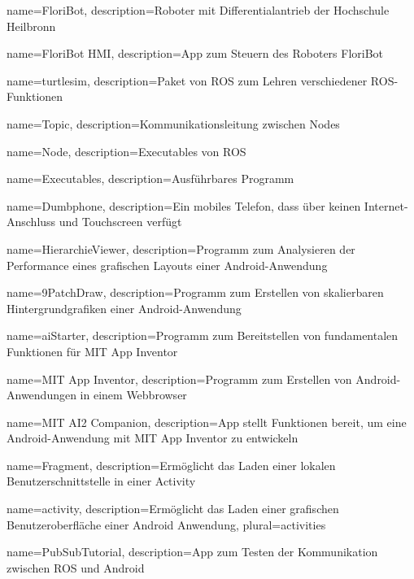 {
  name=FloriBot,
  description={Roboter mit Differentialantrieb der Hochschule Heilbronn}
}

{
  name=FloriBot HMI,
  description={App zum Steuern des Roboters FloriBot}
}

{
  name=turtlesim,
  description={Paket von ROS zum Lehren verschiedener ROS-Funktionen}
}

{
  name=Topic,
  description={Kommunikationsleitung zwischen Nodes}
}

{
  name=Node,
  description={Executables von ROS}
}

{
  name=Executables,
  description={Ausführbares Programm}
}

{
  name=Dumbphone,
  description={Ein mobiles Telefon, dass über keinen Internet-Anschluss und Touchscreen verfügt}
}

{
  name=HierarchieViewer,
  description={Programm zum Analysieren der Performance eines grafischen Layouts einer Android-Anwendung}
}

{
  name=9PatchDraw,
  description={Programm zum Erstellen von skalierbaren Hintergrundgrafiken einer Android-Anwendung}
}

{
  name=aiStarter,
  description={Programm zum Bereitstellen von fundamentalen Funktionen für MIT App Inventor}
}

{
  name=MIT App Inventor,
  description={Programm zum Erstellen von Android-Anwendungen in einem Webbrowser}
}

{
  name=MIT AI2 Companion,
  description={App stellt Funktionen bereit, um eine Android-Anwendung mit MIT App Inventor zu entwickeln}
}

{
  name=Fragment,
  description={Ermöglicht das Laden einer lokalen Benutzerschnittstelle in einer Activity}
}

{
  name=activity,
  description={Ermöglicht das Laden einer grafischen Benutzeroberfläche einer Android Anwendung},
  plural={activities}
}

{
  name=PubSubTutorial,
  description={App zum Testen der Kommunikation zwischen ROS und Android}
}

